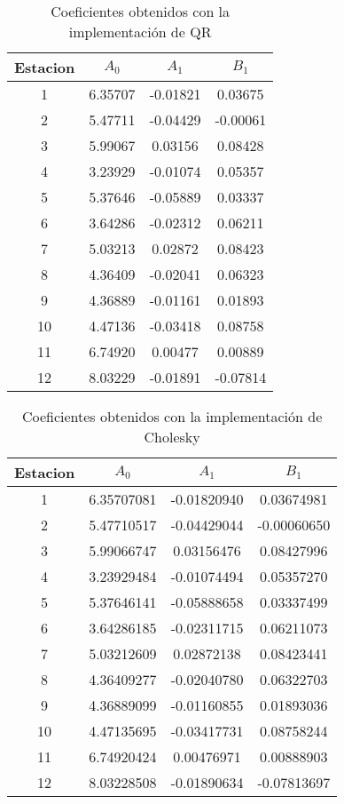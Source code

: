 \documentclass[]{article}
\begin{document}
\begin{table}[h!tbp]
    \centering
	\begin{tabular}{|c|c|c|c|}
		\hline 
		Estacion & $A_0$ & $A_1$ & $B_1$ \\
		\hline \hline
		1 & 6.35707 & -0.01821 & 0.03675 \\ \hline
		2 & 5.47711	& -0.04429 & -0.00061 \\ \hline
		3 & 5.99067 & 0.03156	& 0.08428\\ \hline
		4 & 3.23929 & -0.01074 & 0.05357 \\ \hline
		5 & 5.37646	& -0.05889	& 0.03337\\ \hline
		6 &3.64286 & -0.02312 & 0.06211\\ \hline
		7 & 5.03213 & 0.02872 & 0.08423\\ \hline
		8 & 4.36409 & -0.02041 & 0.06323 \\ \hline
		9 & 4.36889	& -0.01161 & 0.01893 \\ \hline
		10 &4.47136	& -0.03418 & 0.08758 \\ \hline
		11 & 6.74920 & 0.00477 & 0.00889 \\ \hline
		12 & 8.03229 & -0.01891 & -0.07814 \\ \hline
		
	\end{tabular}
	\caption{Coeficientes obtenidos con la implementación de QR}
	\label{table:}
\end{table}


\begin{table}[h!tbp]
    \centering
	\begin{tabular}{|c|c|c|c|}
		\hline 
		Estacion & $A_0$ & $A_1$ & $B_1$ \\
		\hline \hline
		1 & 6.35707081 & -0.01820940 & 0.03674981 \\ \hline
		2 & 5.47710517 &	-0.04429044	& -0.00060650 \\ \hline
		3 &5.99066747 &	0.03156476 &	0.08427996\\ \hline
		4 & 3.23929484 &	-0.01074494 &	0.05357270 \\ \hline
		5 & 5.37646141 &	-0.05888658 &	0.03337499\\ \hline
		6 &3.64286185 &	-0.02311715 &	0.06211073\\ \hline
		7 & 5.03212609 &	0.02872138 &	0.08423441\\ \hline
		8 &4.36409277 &	-0.02040780	 & 0.06322703 \\ \hline
		9 &4.36889099 &	-0.01160855 &	0.01893036 \\ \hline
		10 & 4.47135695 &	-0.03417731 &	0.08758244 \\ \hline
		11 & 6.74920424 &	0.00476971 &	0.00888903 \\ \hline
		12 & 8.03228508 & -0.01890634 & -0.07813697 \\ \hline

	\end{tabular}
	\caption{Coeficientes obtenidos con la implementación de Cholesky}
	\label{table:}
\end{table}
\end{document}

